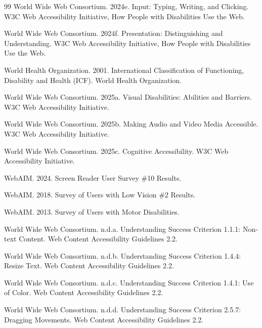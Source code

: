 \documentclass[11pt]{article}
\begin{document}
\begin{thebibliography}{99}
World Wide Web Consortium. 2024e.
\newblock Input: Typing, Writing, and Clicking.
\newblock W3C Web Accessibility Initiative, How People with Disabilities Use the Web.

World Wide Web Consortium. 2024f.
\newblock Presentation: Distinguishing and Understanding.
\newblock W3C Web Accessibility Initiative, How People with Disabilities Use the Web.

World Health Organization. 2001.
\newblock International Classification of Functioning, Disability and Health (ICF).
\newblock World Health Organization.

World Wide Web Consortium. 2025a.
\newblock Visual Disabilities: Abilities and Barriers.
\newblock W3C Web Accessibility Initiative.

World Wide Web Consortium. 2025b.
\newblock Making Audio and Video Media Accessible.
\newblock W3C Web Accessibility Initiative.

World Wide Web Consortium. 2025c.
\newblock Cognitive Accessibility.
\newblock W3C Web Accessibility Initiative.

WebAIM. 2024.
\newblock Screen Reader User Survey \#10 Results.

WebAIM. 2018.
\newblock Survey of Users with Low Vision \#2 Results.

WebAIM. 2013.
\newblock Survey of Users with Motor Disabilities.

World Wide Web Consortium. n.d.a.
\newblock Understanding Success Criterion 1.1.1: Non-text Content.
\newblock Web Content Accessibility Guidelines 2.2.

World Wide Web Consortium. n.d.b.
\newblock Understanding Success Criterion 1.4.4: Resize Text.
\newblock Web Content Accessibility Guidelines 2.2.

World Wide Web Consortium. n.d.c.
\newblock Understanding Success Criterion 1.4.1: Use of Color.
\newblock Web Content Accessibility Guidelines 2.2.

World Wide Web Consortium. n.d.d.
\newblock Understanding Success Criterion 2.5.7: Dragging Movements.
\newblock Web Content Accessibility Guidelines 2.2.


\end{thebibliography}
\end{document}
